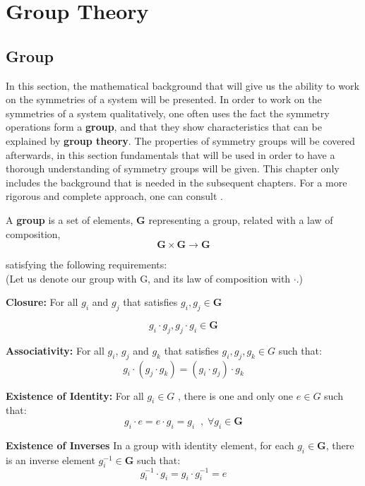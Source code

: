 \chapter{Group Theory}
\thispagestyle{empty}

\section{Group}

In this section, the mathematical background that will give us the ability to
work on the symmetries of a system will be presented. In order to work on the
symmetries of a system qualitatively, one often uses the fact the symmetry operations
form a \textbf{group}, and that they show characteristics that can be
explained by \textbf{group theory}. The properties of symmetry groups will be covered
afterwards, in this section fundamentals that will be used in order to have a
thorough understanding of symmetry groups will be given. This chapter only includes the background that is needed in the subsequent chapters. For a more rigorous and complete approach, one can consult  \citet{rosen_symmetry_1995, armstrong_groups_1988}.

\begin{definition}[Group]
\label{def:group}
    A \textbf{group} is a set of elements, \textbf{G} representing a group, related with a law of composition,
     \[\mathbf{G} \times \mathbf{G} \rightarrow \mathbf{G} \]
     
    satisfying the following requirements:\\

(Let us denote our group with G, and its law of composition with $\cdot$.)\\

\textbf{Closure:} For all $g_i$ and $g_j$ that satisfies $g_i, g_j \in \mathbf{G} $

\[g_i\cdot g_j,g_j\cdot g_i \in \mathbf{G}\]

\textbf{Associativity:} For all $g_i$, $g_j$ and $g_k$ that satisfies $g_i, g_j,
g_k \in G$ such that:
\[g_i\cdot (g_j\cdot g_k) = (g_i\cdot g_j) \cdot g_k \]

\textbf{Existence of Identity:} For all $g_i \in G$ , there is one and only one $e
\in G$ such that:
\[g_i \cdot e = e \cdot g_i = g_i \;\; , \; \forall g_i  \in \mathbf{G}\]

\textbf{Existence of Inverses} In a group with identity element, for each $g_i \in \mathbf{G} $, there is an inverse element $g_i^{-1} \in  \mathbf{G} $ such that:
\[ g_i^{-1}\cdot g_i = g_i \cdot g_i^{-1} = e \]
\end{definition}

